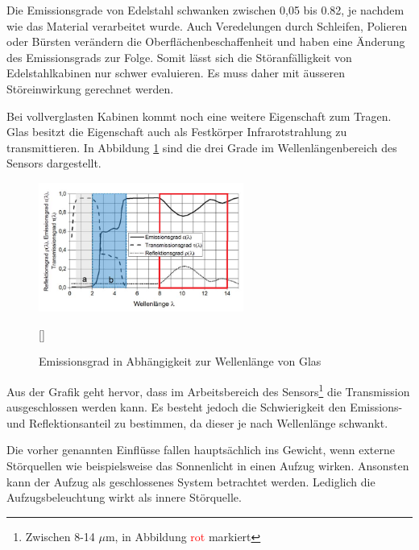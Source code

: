 Die Emissionsgrade von Edelstahl schwanken zwischen 0,05 bis 0.82, je nachdem wie das Material verarbeitet wurde. Auch Veredelungen durch Schleifen, Polieren oder Bürsten verändern die Oberflächenbeschaffenheit und haben eine Änderung des Emissionsgrads zur Folge. Somit lässt sich die Störanfälligkeit von Edelstahlkabinen nur schwer evaluieren. Es muss daher mit äusseren Störeinwirkung gerechnet werden. 

Bei vollverglasten Kabinen kommt noch eine weitere Eigenschaft zum Tragen. Glas besitzt die Eigenschaft auch als Festkörper Infrarotstrahlung zu transmittieren. In Abbildung \ref{fig:Glas} sind die drei Grade im  Wellenlängenbereich des Sensors dargestellt. 

\begin{figure}[H]
	\centering
	\includegraphics[width=0.6\textwidth]
	{fig/Glas_bearbeitet.png}
	\caption[Emissionsgrad in Abhängigkeit zur Wellenlänge von Glas]{Emissionsgrad in Abhängigkeit zur Wellenlänge von Glas}[\cite{Glas}] 
	\label{fig:Glas}	
\end{figure}

Aus der Grafik geht hervor, dass im Arbeitsbereich des Sensors\footnote[11]{Zwischen 8-14 $\mu$m, in Abbildung \textcolor{red}{rot} markiert} die Transmission ausgeschlossen werden kann. Es besteht jedoch die Schwierigkeit den Emissions- und Reflektionsanteil zu bestimmen, da dieser je nach Wellenlänge schwankt.

Die vorher genannten Einflüsse fallen hauptsächlich ins Gewicht, wenn externe Störquellen wie beispielsweise das Sonnenlicht in einen Aufzug wirken. Ansonsten kann der Aufzug als geschlossenes System betrachtet werden. Lediglich die Aufzugsbeleuchtung wirkt als innere Störquelle.

